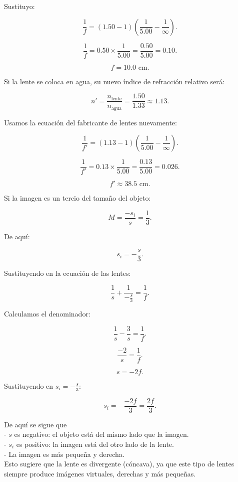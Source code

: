Sustituyo:

\[
\frac{1}{f} = (1.50 - 1) \left( \frac{1}{5.00} - \frac{1}{\infty} \right).
\]

\[
\frac{1}{f} = 0.50 \times \frac{1}{5.00} = \frac{0.50}{5.00} = 0.10.
\]

\[
f = 10.0 \text{ cm}.
\]

Si la lente se coloca en agua, su nuevo índice de refracción relativo será:

\[
n' = \frac{n_{\text{lente}}}{n_{\text{agua}}} = \frac{1.50}{1.33} \approx 1.13.
\]

Usamos la ecuación del fabricante de lentes nuevamente:

\[
\frac{1}{f'} = (1.13 - 1) \left( \frac{1}{5.00} - \frac{1}{\infty} \right).
\]

\[
\frac{1}{f'} = 0.13 \times \frac{1}{5.00} = \frac{0.13}{5.00} = 0.026.
\]

\[
f' \approx 38.5 \text{ cm}.
\]

Si la imagen es un tercio del tamaño del objeto:

\[
M = \frac{-s_i}{s} = \frac{1}{3}.
\]

De aquí:

\[
s_i = -\frac{s}{3}.
\]

Sustituyendo en la ecuación de las lentes:

\[
\frac{1}{s} + \frac{1}{-\frac{s}{3}} = \frac{1}{f}.
\]

Calculamos el denominador:

\[
\frac{1}{s} - \frac{3}{s} = \frac{1}{f}.
\]

\[
\frac{-2}{s} = \frac{1}{f}.
\]

\[
s = -2f.
\]

Sustituyendo en \( s_i = -\frac{s}{3} \):

\[
s_i = -\frac{-2f}{3} = \frac{2f}{3}.
\]

De aquí se sigue que \\
- \( s \) es negativo: el objeto está del mismo lado que la imagen.   \\
- \( s_i \) es positivo: la imagen está del otro lado de la lente.  \\
- La imagen es más pequeña y derecha. \\

Esto sugiere que la lente es divergente (cóncava), ya que este tipo de lentes siempre produce imágenes virtuales, derechas y más pequeñas.